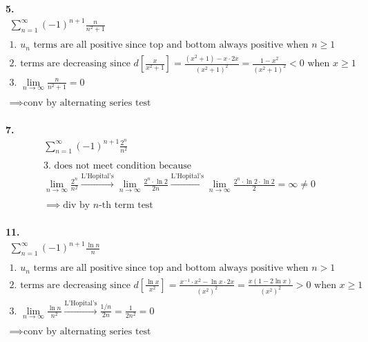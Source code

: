 \documentclass{article}
\begin{document}
\noindent
\textbf{5.}
\begin{gather*}
\sum_{n=1}^{\infty} (-1)^{n+1} \frac{n}{n^2+1}
\\
\\
\text{1. $u_n$ terms are all positive since top and bottom always positive when } n \geq 1
\\
\text{2. terms are decreasing since }
d \left[ \frac{x}{x^2+1} \right]
=\frac{(x^2+1)-x \cdot 2x}{(x^2+1)^2}
=\frac{1-x^2}{(x^2+1)^2}<0
\text{~when } x \geq 1
\\
\text{3. } \lim_{n \to \infty} \frac{n}{n^2+1}=0
\\
\\
\implies \text{conv by alternating series test}
\end{gather*}
\hfill
\\




\noindent
\textbf{7.}
\begin{gather*}
\sum_{n=1}^{\infty} (-1)^{n+1} \frac{2^n}{n^2}
\\
\\
\text{3. does not meet condition because}
\\
\lim_{n \to \infty} \frac{2^n}{n^2}
\xrightarrow{\text{L'Hopital's}}
\lim_{n \to \infty} \frac{2^n \cdot \ln 2}{2n}
\xrightarrow{\text{L'Hopital's}}
\lim_{n \to \infty} \frac{2^n \cdot \ln 2 \cdot \ln 2}{2}=\infty \neq 0
\\
\\
\implies \text{div by $n$-th term test}
\end{gather*}
\hfill
\\



\noindent
\textbf{11.}
\begin{gather*}
\sum_{n=1}^{\infty} (-1)^{n+1} \frac{\ln n}{n}
\\
\\
\text{1. $u_n$ terms are all positive since top and bottom always positive when } n > 1
\\
\text{2. terms are decreasing since }
d \left[ \frac{\ln x}{x^2} \right]
= \frac{x^{-1}\cdot x^2 - \ln x \cdot 2x}{(x^2)^2}
= \frac{x(1 - 2\ln x)}{(x^2)^2}>0
\text{~when } x \geq 1
\\
\text{3. } \lim_{n \to \infty} \frac{\ln n}{n^2}
\xrightarrow{\text{L'Hopital's}} \frac{1/n}{2n}=\frac{1}{2n^2}=0
\\
\\
\implies \text{conv by alternating series test}
\end{gather*}
\hfill
\\
\end{document}
